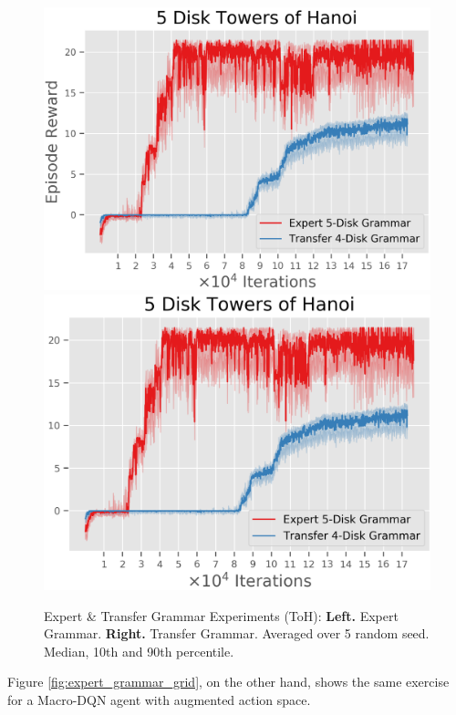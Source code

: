 \documentclass[10pt,letterpaper]{article}
\begin{document}
\begin{figure}[H]
  \includegraphics[width=\linewidth]{figures/hanoi_5_learning_curve}
\endminipage\hfill
{}
  \includegraphics[width=\linewidth]{figures/hanoi_6_learning_curve}
\endminipage\hfill
\caption{Expert \& Transfer Grammar Experiments (ToH): \textbf{Left.} Expert Grammar. \textbf{Right.} Transfer Grammar. Averaged over 5 random seed. Median, 10th and 90th percentile.}
\label{fig:expert_grammar_toh}
\end{figure}

Figure \ref{fig:expert_grammar_grid}, on the other hand, shows the same exercise for a Macro-DQN agent with augmented action space.
\end{document}
